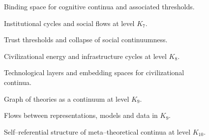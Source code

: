 \begin{figure}[p]
  \centering
  
  \caption{Binding space for cognitive continua and associated thresholds.}
  \label{fig:binding-space}
\end{figure}

\begin{figure}[p]
  \centering
  
  \caption{Institutional cycles and social flows at level \texorpdfstring{\(K_7\)}{K_7}.}
  \label{fig:institutional-cycles}
\end{figure}

\begin{figure}[p]
  \centering
  
  \caption{Trust thresholds and collapse of social continuumness.}
  \label{fig:trust-threshold}
\end{figure}

\begin{figure}[p]
  \centering
  
  \caption{Civilizational energy and infrastructure cycles at level \texorpdfstring{\(K_8\)}{K_8}.}
  \label{fig:civilization-energy-cycles}
\end{figure}

\begin{figure}[p]
  \centering
  
  \caption{Technological layers and embedding spaces for civilizational
           continua.}
  \label{fig:technological-layers-m8}
\end{figure}

\begin{figure}[p]
  \centering
  
  \caption{Graph of theories as a continuum at level \texorpdfstring{\(K_9\)}{K_9}.}
  \label{fig:theory-graph}
\end{figure}

\begin{figure}[p]
  \centering
  
  \caption{Flows between representations, models and data in \texorpdfstring{\(K_9\)}{K_9}.}
  \label{fig:representation-flow-graph}
\end{figure}

\begin{figure}[p]
  \centering
  
  \caption{Self--referential structure of meta--theoretical continua at
           level \(K_{10}\).}
  \label{fig:metatheory-k10-selfreference}
\end{figure}
